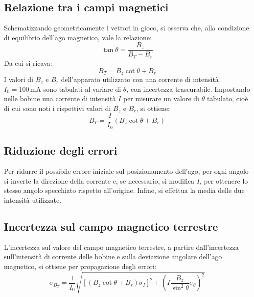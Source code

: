\documentclass[a4paper,12pt]{article}
\begin{document}
\subsection{Relazione tra i campi magnetici}
Schematizzando geometricamente i vettori in gioco, si osserva che, alla condizione di equilibrio dell'ago magnetico, vale la relazione:
\begin{equation}
    \tan \theta = \frac{B_z}{B_T - B_r}
    \label{eq:tan_theta}
\end{equation}
Da cui si ricava:
\begin{equation}
    B_T = B_z \cot \theta + B_r
    \label{eq:BT_formula}
\end{equation}
I valori di \( B_z \) e \( B_r \) dell’apparato utilizzato con una corrente di intensità \( I_0 = 100 \, \text{mA} \) sono tabulati al variare di \( \theta \), con incertezza trascurabile.
Impostando nelle bobine una corrente di intensità \( I \) per misurare un valore di \( \theta \) tabulato, cioè di cui sono noti i rispettivi valori di \( B_z \) e \( B_r \), si ottiene:
\begin{equation}
    B_T = \frac{I}{I_0} \left( B_z \cot \theta + B_r \right)
    \label{eq:BT_with_I}
\end{equation}

\subsection{Riduzione degli errori}
Per ridurre il possibile errore iniziale sul posizionamento dell’ago, per ogni angolo si inverte la direzione della corrente e, se necessario, si modifica \( I \), per ottenere lo stesso angolo specchiato rispetto all’origine. Infine, si effettua la media delle due intensità utilizzate.

\subsection{Incertezza sul campo magnetico terrestre}
L’incertezza sul valore del campo magnetico terrestre, a partire dall’incertezza sull’intensità di corrente delle bobine e sulla deviazione angolare dell’ago magnetico, si ottiene per propagazione degli errori:
\begin{equation}
    \sigma_{B_T} = \frac{1}{I_0} \sqrt{\left[ \left( B_z \cot \theta + B_r \right) \sigma_I \right]^2 + \left( I \frac{B_z}{\sin^2 \theta} \sigma_\theta \right)^2}
    \label{eq:sigma_BT}
\end{equation}
\end{document}

